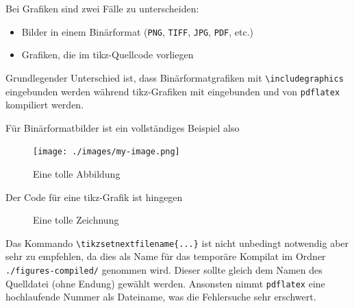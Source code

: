 Bei Grafiken sind zwei Fälle zu unterscheiden:
\begin{itemize}
  \item {}Bilder in einem Binärformat (\texttt{PNG}, \texttt{TIFF}, \texttt{JPG}, \texttt{PDF}, etc.)
	\item {}Grafiken, die im \gls{tikz}-Quellcode vorliegen 
\end{itemize}
Grundlegender Unterschied ist, dass Binärformatgrafiken mit \verb#\includegraphics#
eingebunden werden während \gls{tikz}-Grafiken mit \verb## eingebunden und
von \texttt{pdflatex} kompiliert werden.

Für Binärformatbilder ist ein vollständiges Beispiel also
\begin{latex}[caption={Binärgrafik in LaTeX},label={lst:binary-image}]
\begin{figure}[htbp]
  \centering
  \texttt{[image: ./images/my-image.png]}
  \caption{Eine tolle Abbildung}
  \label{fig:my-image}
\end{figure}
\end{latex}
Der Code für eine \gls{tikz}-Grafik ist hingegen
\begin{latex}[caption={TikZ-Zeichnung in LaTeX},label={lst:tikz-figure}]
\begin{figure}[htbp]
  \centering
  
  \caption{Eine tolle Zeichnung}
  \label{fig:my-figure}
\end{figure}
\end{latex}
Das Kommando \verb#\tikzsetnextfilename{...}# ist nicht unbedingt notwendig
aber sehr zu empfehlen, da dies als Name für das temporäre Kompilat im Ordner
\texttt{./figures-compiled/} genommen wird. Dieser sollte gleich dem Namen
des Quelldatei (ohne Endung) gewählt werden. Ansonsten nimmt \texttt{pdflatex}
eine hochlaufende Nummer als Dateiname, was die Fehlersuche sehr erschwert.

